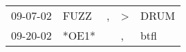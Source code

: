 \begin{supertabular}{p{0.07\textwidth}p{0.06\textwidth}p{0.02\textwidth}p{0.02\textwidth}p{0.06\textwidth}}
 09-07-02\textsuperscript{} &  FUZZ\textsuperscript{} &  , &  \textgreater &  DRUM\textsuperscript{} \\
 09-20-02\textsuperscript{} &                   *OE1* &    &             , &  btfl\textsuperscript{} \\
\end{supertabular}
